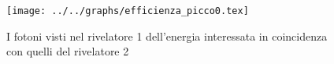 \begin{figure}[h] \centering\texttt{[image: ../../graphs/efficienza\_picco0.tex]}\caption{I fotoni visti nel rivelatore 1 dell'energia interessata in coincidenza con quelli del rivelatore 2}\label{gr:efficienza_picco0} \end{figure}
